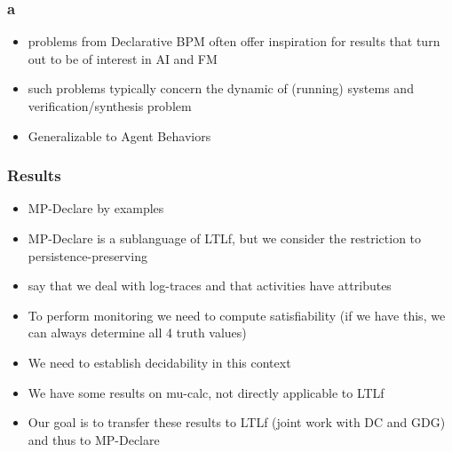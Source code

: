 \documentclass{beamer}
\begin{document}
\begin{frame}
\frametitle{a}

\begin{itemize}
	\item problems from Declarative BPM often offer inspiration for 
		results that turn out to be of interest in AI and FM
	\item such problems typically concern the dynamic of (running) systems and 
		verification/synthesis problem
	\item Generalizable to Agent Behaviors
\end{itemize}

\end{frame}


\begin{frame}
\frametitle{Results}

\begin{itemize}
	\item MP-Declare by examples
	\item MP-Declare is a sublanguage of LTLf, but we consider the restriction to persistence-preserving
	\item say that we deal with log-traces and that activities have attributes
	\item To perform monitoring we need to compute satisfiability (if we have this, we can always determine all 4 truth values)
	\item We need to establish decidability in this context
	\item We have some results on mu-calc, not directly applicable to LTLf
	\item Our goal is to transfer these results to LTLf (joint work with DC and GDG) 
		and thus to MP-Declare
\end{itemize}

\end{frame}

\end{document}
